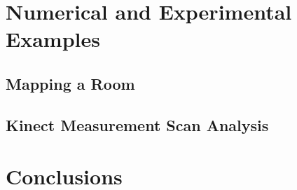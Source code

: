 \section{Numerical and Experimental Examples}

\subsection{Mapping a Room}

\subsection{Kinect Measurement Scan Analysis}


\section{Conclusions}

